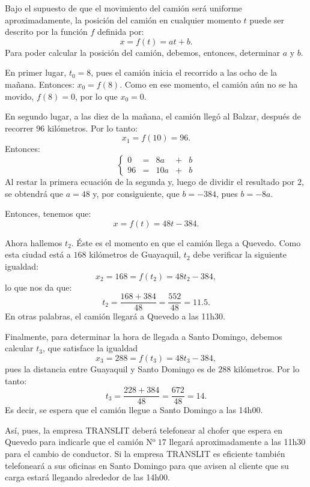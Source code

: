 \begin{exemplo}[]{}
Bajo el supuesto de que el movimiento del camión será uniforme aproximadamente, la posición del
camión en cualquier momento $t$ puede ser descrito por la función $f$ definida por:
\begin{equation*}
	x=f(t)= at + b.
\end{equation*}
Para poder calcular la posición del camión, debemos, entonces, determinar $a$ y $b$.

En primer lugar, $t_0 = 8$, pues el camión inicia el recorrido a las ocho de la mañana. Entonces:
$x_0= f(8)$. Como en ese momento, el camión aún no se ha movido, $f(8) = 0$, por lo que $x_0 = 0$.

En segundo lugar, a las diez de la mañana, el camión llegó al Balzar, después de recorrer $96$
kilómetros. Por lo tanto:
\[
x_1 = f(10) = 96.
\]
Entonces:
\begin{equation*}
\left\{
\begin{matrix}
0 & = & 8a & + & b\\
96 & = & 10a& + & b
\end{matrix}
\right.
\end{equation*}
Al restar la primera ecuación de la segunda y, luego de dividir el resultado por $2$, se obtendrá
que $a=48$ y, por consiguiente, que $b=-384$, pues $b = -8a$.

Entonces, tenemos que:
\begin{equation*}
x = f(t)= 48t-384.
\end{equation*}

Ahora hallemos $t_2$. Éste es el momento en que el camión llega a Quevedo. Como esta ciudad está a
$168$ kilómetros de Guayaquil, $t_2$ debe verificar la siguiente igualdad:
\begin{equation*}
x_2 = 168 = f(t_2)= 48t_2 - 384,
\end{equation*}
lo que nos da que:
\begin{equation*}
t_2 =\frac{168+384}{48}=\frac{552}{48}=11.5.
\end{equation*}
En otras palabras, el camión llegará a Quevedo a las 11h30.

Finalmente, para determinar la hora de llegada a Santo Domingo, debemos calcular $t_3$, que
satisface la igualdad
\begin{equation*}
x_3 =288= f(t_3)= 48t_3-384,
\end{equation*}
pues la distancia entre Guayaquil y Santo Domingo es de $288$ kilómetros. Por lo tanto:
\begin{equation*}
t_3 =\frac{228+384}{48}=\frac{672}{48}=14.
\end{equation*}
Es decir, se espera que el camión llegue a Santo Domingo a las 14h00.

Así, pues, la empresa TRANSLIT deberá telefonear al chofer que espera en Quevedo  para indicarle
que el camión N$^\text{o }17$ llegará aproximadamente a las 11h30 para el cambio de conductor. Si
la empresa TRANSLIT es eficiente también telefoneará a sus oficinas en Santo Domingo para que
avisen al cliente que su carga estará llegando alrededor de las 14h00.
\end{exemplo}

